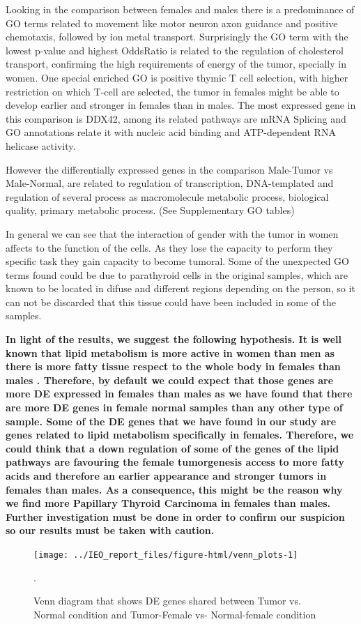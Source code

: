 \documentclass[9pt,twocolumn,twoside]{gsajnl}
\begin{document}
Looking in the comparison between females and males there is a predominance of GO terms related to movement like motor neuron axon guidance and positive chemotaxis, followed by ion metal transport. Surprisingly the GO term with the lowest p-value and highest OddsRatio is related to the regulation of cholesterol transport, confirming the high requirements of energy of the tumor, specially in women. One special enriched GO is positive thymic T cell selection, with higher restriction on which T-cell are selected, the tumor in females might be able to develop earlier and stronger in females than in males. The most expressed gene in this comparison is DDX42, among its related pathways are mRNA Splicing and GO annotations relate it with nucleic acid binding and ATP-dependent RNA helicase activity.

However the differentially expressed genes in the comparison Male-Tumor vs Male-Normal, are related to regulation of transcription, DNA-templated and regulation of several process as macromolecule metabolic process, biological quality, primary metabolic process. (See Supplementary GO tables)

In general we can see that the interaction of gender with the tumor in women affects to the function of the cells. As they lose the capacity to perform they specific task they gain capacity to become tumoral. Some of the unexpected GO terms found could be due to parathyroid cells in the original samples, which are known to be located in difuse and different regions depending on the person, so it can not be discarded that this tissue could have been included in some of the samples.

\textbf{In light of the results, we suggest the following hypothesis. It is well known that lipid metabolism is more active in women than men as there is more fatty tissue respect to the whole body in females than males \citep{Blaak2001}. Therefore, by default we could expect that those genes are more DE expressed in females than males as we have found that there are more DE genes in female normal samples than any other type of sample. Some of the DE genes that we have found in our study are genes related to lipid metabolism specifically in females. Therefore, we could think that a down regulation of some of the genes of the lipid pathways are favouring the female tumorgenesis access to more fatty acids and therefore an earlier appearance and stronger tumors in females than males. As a consequence, this might be the reason why we find more Papillary Thyroid Carcinoma in females than males. Further investigation must be done in order to confirm our suspicion so our results must be taken with caution.}
 
\begin{figure}
\centering
\texttt{[image: ../IEO\_report\_files/figure-html/venn\_plots-1]}
\caption{Venn diagram that shows DE genes shared between Tumor vs. Normal condition and Tumor-Female vs- Normal-female condition }.
\label{fig:venn1}
\end{figure}

  

\end{document}
